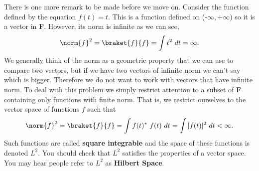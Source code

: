 There is one more remark to be made before we move on.  Consider the function defined by the equation $f(t)=t$.  This is a function defined on \mbox{(-$\infty,+\infty$)} so it is a vector in \textbf{F}.  However, its norm is infinite as we can see,
\begin{displaymath} \norm{f}^2 = \braket{f}{f} = \int t^2~dt = \infty. \end{displaymath}
We generally think of the norm as a geometric property that we can use to compare two vectors, but if we have two vectors of infinite norm we can't say which is bigger.  Therefore we do not want to work with vectors that have infinite norm.  To deal with this problem we simply restrict attention to a subset of \textbf{F} containing only functions with finite norm.  That is, we restrict ourselves to the vector space of functions $f$ such that
\begin{displaymath} \norm{f}^2 = \braket{f}{f} = \int f(t)^*~f(t)~dt = \int |f(t)|^2~dt < \infty. \end{displaymath}
Such functions are called \textbf{square integrable} and the space of these functions is denoted $L^2$.  You should check that $L^2$ satisfies the properties of a vector space.  You may hear people refer to $L^2$ as \textbf{Hilbert Space}.

